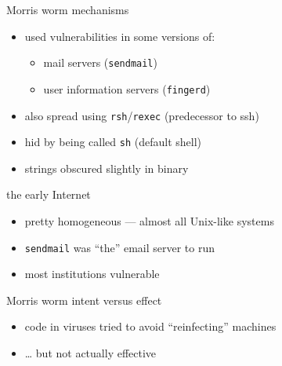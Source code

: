 \begin{frame}{Morris worm mechanisms}
\begin{itemize}
    \item used vulnerabilities in some versions of:
        \begin{itemize}
        \item mail servers ({\tt sendmail})
        \item user information servers ({\tt fingerd})
        \end{itemize}
    \item also spread using {\tt rsh}/{\tt rexec} (predecessor to ssh)
    \item hid by being called {\tt sh} (default shell)
    \item strings obscured slightly in binary
\end{itemize}
\end{frame}

\begin{frame}{the early Internet}
    \begin{itemize}
    \item pretty homogeneous --- almost all Unix-like systems
    \item {\tt sendmail} was ``the'' email server to run
    \item most institutions vulnerable
    \end{itemize}
\end{frame}

\begin{frame}{Morris worm intent versus effect}
\begin{itemize}
\item code in viruses tried to avoid ``reinfecting'' machines
\item \ldots{} but not actually effective
\end{itemize}
\end{frame}


